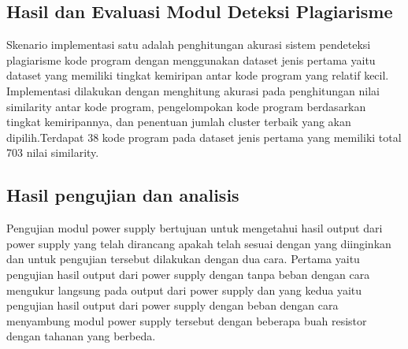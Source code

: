 \subsection{Hasil dan Evaluasi Modul Deteksi Plagiarisme}
Skenario implementasi satu adalah penghitungan akurasi sistem pendeteksi plagiarisme kode program dengan menggunakan dataset jenis pertama yaitu dataset yang memiliki tingkat kemiripan antar kode program yang relatif kecil. Implementasi dilakukan dengan menghitung akurasi pada penghitungan nilai similarity antar kode program, pengelompokan kode program berdasarkan tingkat kemiripannya, dan penentuan jumlah cluster terbaik yang akan dipilih.Terdapat 38 kode program pada dataset jenis pertama yang memiliki total 703 nilai similarity.
\subsection{Hasil pengujian dan analisis}
Pengujian modul power supply bertujuan  untuk mengetahui hasil output dari power supply yang telah dirancang apakah telah sesuai dengan yang diinginkan dan untuk pengujian tersebut dilakukan dengan dua cara. Pertama yaitu pengujian hasil output dari power supply dengan tanpa beban dengan cara mengukur langsung pada output dari power supply  dan yang kedua yaitu pengujian hasil output dari power supply dengan beban dengan cara menyambung modul power supply tersebut dengan beberapa buah resistor dengan tahanan yang berbeda.
